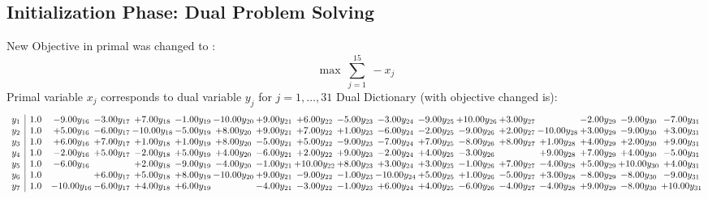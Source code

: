 \documentclass[9pt]{article}
\begin{document}
\subsection{Initialization Phase: Dual Problem Solving}
New Objective in primal was changed to : \[ \max\ \sum_{j=1}^{15}\ - x_j \] 
Primal variable $x_j$ corresponds to dual variable $y_j$ for $j = 1,\ldots,31$
Dual Dictionary (with objective changed is): 
\[\begin{array}{c| c c@{\hskip 2pt} c@{\hskip 2pt} c@{\hskip 2pt} c@{\hskip 2pt} c@{\hskip 2pt} c@{\hskip 2pt} c@{\hskip 2pt} c@{\hskip 2pt} c@{\hskip 2pt} c@{\hskip 2pt} c@{\hskip 2pt} c@{\hskip 2pt} c@{\hskip 2pt} c@{\hskip 2pt} c@{\hskip 2pt} c@{\hskip 2pt} }
 y_{1}   &  1.0 & -9.00 y_{16} & -3.00 y_{17} & +  7.00 y_{18} & -1.00 y_{19} & -10.00 y_{20} & +  9.00 y_{21} & +  6.00 y_{22} & -5.00 y_{23} & -3.00 y_{24} & -9.00 y_{25} & + 10.00 y_{26} & +  3.00 y_{27} &   & -2.00 y_{29} & -9.00 y_{30} & -7.00 y_{31}\\
 y_{2}   &  1.0 & +  5.00 y_{16} & -6.00 y_{17} & -10.00 y_{18} & -5.00 y_{19} & +  8.00 y_{20} & +  9.00 y_{21} & +  7.00 y_{22} & +  1.00 y_{23} & -6.00 y_{24} & -2.00 y_{25} & -9.00 y_{26} & +  2.00 y_{27} & -10.00 y_{28} & +  3.00 y_{29} & -9.00 y_{30} & +  3.00 y_{31}\\
 y_{3}   &  1.0 & +  6.00 y_{16} & +  7.00 y_{17} & +  1.00 y_{18} & +  1.00 y_{19} & +  8.00 y_{20} & -5.00 y_{21} & +  5.00 y_{22} & -9.00 y_{23} & -7.00 y_{24} & +  7.00 y_{25} & -8.00 y_{26} & +  8.00 y_{27} & +  1.00 y_{28} & +  4.00 y_{29} & +  2.00 y_{30} & +  9.00 y_{31}\\
 y_{4}   &  1.0 & -2.00 y_{16} & +  5.00 y_{17} & -2.00 y_{18} & +  5.00 y_{19} & +  4.00 y_{20} & -6.00 y_{21} & +  2.00 y_{22} & +  9.00 y_{23} & -2.00 y_{24} & +  4.00 y_{25} & -3.00 y_{26} &   & +  9.00 y_{28} & +  7.00 y_{29} & +  4.00 y_{30} & -5.00 y_{31}\\
 y_{5}   &  1.0 & -6.00 y_{16} &   & +  2.00 y_{18} & -9.00 y_{19} & -4.00 y_{20} & -1.00 y_{21} & + 10.00 y_{22} & +  8.00 y_{23} & +  3.00 y_{24} & +  3.00 y_{25} & -1.00 y_{26} & +  7.00 y_{27} & -4.00 y_{28} & +  5.00 y_{29} & + 10.00 y_{30} & +  4.00 y_{31}\\
 y_{6}   &  1.0  &   & +  6.00 y_{17} & +  5.00 y_{18} & +  8.00 y_{19} & -10.00 y_{20} & +  9.00 y_{21} & -9.00 y_{22} & -1.00 y_{23} & -10.00 y_{24} & +  5.00 y_{25} & +  1.00 y_{26} & -5.00 y_{27} & +  3.00 y_{28} & -8.00 y_{29} & -8.00 y_{30} & -9.00 y_{31}\\
 y_{7}   &  1.0 & -10.00 y_{16} & -6.00 y_{17} & +  4.00 y_{18} & +  6.00 y_{19} &   & -4.00 y_{21} & -3.00 y_{22} & -1.00 y_{23} & +  6.00 y_{24} & +  4.00 y_{25} & -6.00 y_{26} & -4.00 y_{27} & -4.00 y_{28} & +  9.00 y_{29} & -8.00 y_{30} & + 10.00 y_{31}\\

\end{array}\]
\end{document}
